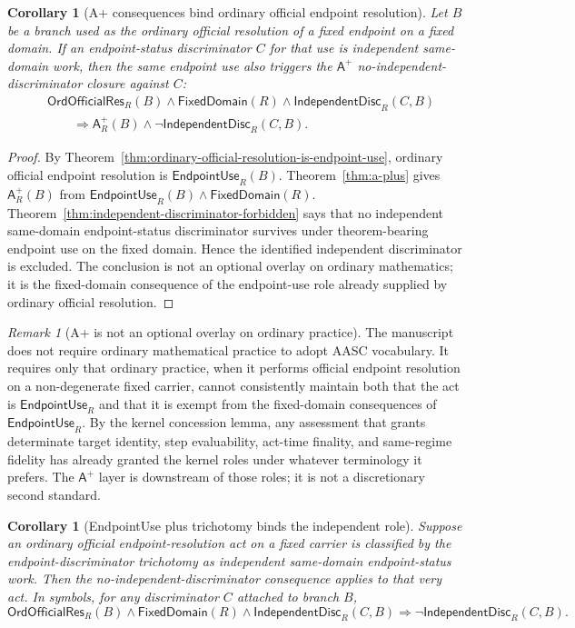 \documentclass[11pt]{article}
\newtheorem{corollary}[theorem]{Corollary}
\theoremstyle{definition}
\theoremstyle{remark}
\newtheorem{remark}[theorem]{Remark}
\newcommand{\Aplus}{\mathsf{A}^{+}}
\newcommand{\EndpointUse}{\mathsf{EndpointUse}}
\newcommand{\IndDisc}{\mathsf{IndependentDisc}}
\newcommand{\FixedDom}{\mathsf{FixedDomain}}
\newcommand{\OrdOfficialRes}{\mathsf{OrdOfficialRes}}
\begin{document}
\begin{corollary}[A+ consequences bind ordinary official endpoint resolution]
\label{cor:aplus-binds-ordinary-official-resolution}
Let \(B\) be a branch used as the ordinary official resolution of a fixed endpoint on a fixed domain. If an endpoint-status discriminator \(C\) for that use is independent same-domain work, then the same endpoint use also triggers the \(\Aplus\) no-independent-discriminator closure against \(C\):
\[
\begin{aligned}
  &\OrdOfficialRes_R(B)\wedge\FixedDom(R)\wedge\IndDisc_R(C,B)\\
  &\qquad\Rightarrow
  \Aplus_R(B)\wedge\neg\IndDisc_R(C,B).
\end{aligned}
\]
\end{corollary}

\begin{proof}
By Theorem~\ref{thm:ordinary-official-resolution-is-endpoint-use}, ordinary official endpoint resolution is \(\EndpointUse_R(B)\). Theorem~\ref{thm:a-plus} gives \(\Aplus_R(B)\) from \(\EndpointUse_R(B)\wedge\FixedDom(R)\). Theorem~\ref{thm:independent-discriminator-forbidden} says that no independent same-domain endpoint-status discriminator survives under theorem-bearing endpoint use on the fixed domain. Hence the identified independent discriminator is excluded. The conclusion is not an optional overlay on ordinary mathematics; it is the fixed-domain consequence of the endpoint-use role already supplied by ordinary official resolution.
\end{proof}

\begin{remark}[A+ is not an optional overlay on ordinary practice]
\label{rem:aplus-not-optional-overlay}
The manuscript does not require ordinary mathematical practice to adopt AASC vocabulary. It requires only that ordinary practice, when it performs official endpoint resolution on a non-degenerate fixed carrier, cannot consistently maintain both that the act is \(\EndpointUse_R\) and that it is exempt from the fixed-domain consequences of \(\EndpointUse_R\). By the kernel concession lemma, any assessment that grants determinate target identity, step evaluability, act-time finality, and same-regime fidelity has already granted the kernel roles under whatever terminology it prefers. The \(\Aplus\) layer is downstream of those roles; it is not a discretionary second standard.
\end{remark}

\begin{corollary}[EndpointUse plus trichotomy binds the independent role]
\label{cor:endpointuse-trichotomy-aplus-binding}
Suppose an ordinary official endpoint-resolution act on a fixed carrier is classified by the endpoint-discriminator trichotomy as independent same-domain endpoint-status work. Then the no-independent-discriminator consequence applies to that very act. In symbols, for any discriminator \(C\) attached to branch \(B\),
\[
  \OrdOfficialRes_R(B)\wedge\FixedDom(R)\wedge\IndDisc_R(C,B)
  \Rightarrow \neg\IndDisc_R(C,B).
\]
\end{corollary}
\end{document}
